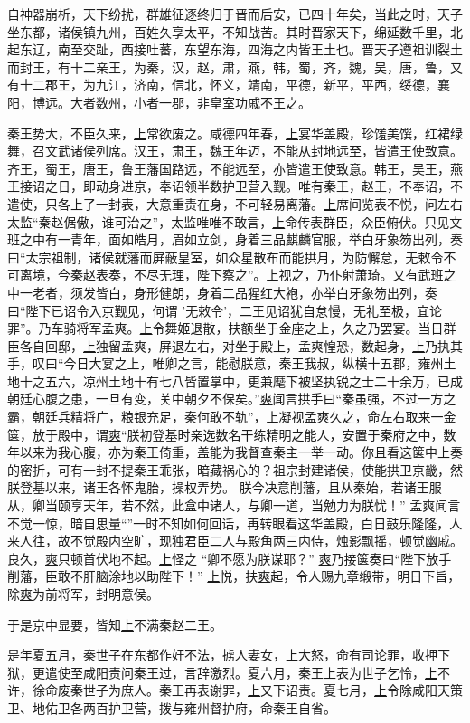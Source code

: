 \documentclass[UTF8]{ctexart}
\begin{document}
自神器崩析，天下纷扰，群雄征逐终归于晋而后安，已四十年矣，当此之时，天子坐东都，诸侯镇九州，百姓久享太平，不知战苦。其时晋家天下，绵延数千里，北起东辽，南至交趾，西接吐蕃，东望东海，四海之内皆王土也。晋天子遵祖训裂土而封王，有十二亲王，为秦，汉，赵，肃，燕，韩，蜀，齐，魏，吴，唐，鲁，又有十二郡王，为九江，济南，信北，怀义，靖南，平德，新平，平西，绥德，襄阳，博远。大者数州，小者一郡，非皇室功戚不王之。


秦王势大，不臣久来，\uline{上}常欲废之。咸德四年春，\uline{上}宴华盖殿，珍馐美馔，红裙绿舞，召文武诸侯列席。汉王，肃王，魏王年迈，不能从封地远至，皆遣王使致意。齐王，蜀王，唐王，鲁王藩国路远，不能远至，亦皆遣王使致意。韩王，吴王，燕王接诏之日，即动身进京，奉诏领半数护卫营入觐。唯有秦王，赵王，不奉诏，不遣使，只各上了一封表，大意重责在身，不可轻易离藩。\uline{上}席间览表不悦，问左右太监“秦赵倨傲，谁可治之”，太监唯唯不敢言，\uline{上}命传表群臣，众臣俯伏。只见文班之中有一青年，面如皓月，眉如立剑，身着三品麒麟官服，举白牙象笏出列，奏曰“太宗祖制，诸侯就藩而屏蔽皇室，如众星散布而能拱月，为防懈怠，无敕令不可离境，今秦赵表奏，不尽无理，陛下察之”。\uline{上}视之，乃仆射萧琦。又有武班之中一老者，须发皆白，身形健朗，身着二品猩红大袍，亦举白牙象笏出列，奏曰“陛下已诏令入京觐见，何谓 ’无敕令’，二王见诏犹自怠慢，无礼至极，宜论罪”。乃车骑将军孟爽。\uline{上}令舞姬退散，扶额坐于金座之上，久之乃罢宴。当日群臣各自回邸，\uline{上}独留孟爽，屏退左右，对坐于殿上，孟爽惶恐，数起身，\uline{上}乃执其手，叹曰“今日大宴之上，唯卿之言，能慰朕意，秦王我叔，纵横十五郡，雍州土地十之五六，凉州土地十有七八皆置掌中，更兼麾下被坚执锐之士二十余万，已成朝廷心腹之患，一旦有变，关中朝夕不保矣。”\uline{爽}闻言拱手曰“秦虽强，不过一方之霸，朝廷兵精将广，粮银充足，秦何敢不轨”，\uline{上}凝视孟爽久之，命左右取来一金箧，放于殿中，谓\uline{爽}“朕初登基时亲选数名干练精明之能人，安置于秦府之中，数年以来为我心腹，亦为秦王倚重，盖能为我督查秦主一举一动。你且看这箧中上奏的密折，可有一封不提秦王乖张，暗藏祸心的？祖宗封建诸侯，使能拱卫京畿，然朕登基以来，诸王各怀鬼胎，操权弄势。 朕今决意削藩，且从秦始，若诸王服从，卿当颐享天年，若不然，此盒中诸人，与卿一道，当勉力为朕忧！” 孟爽闻言不觉一惊，暗自思量“”一时不知如何回话，再转眼看这华盖殿，白日鼓乐隆隆，人来人往，故不觉殿内空旷，现独君臣二人与殿角两三内侍，烛影飘摇，顿觉幽戚。良久，\uline{爽}只顿首伏地不起。\uline{上}怪之 “卿不愿为朕谋耶？” \uline{爽}乃接箧奏曰“陛下放手削藩，臣敢不肝脑涂地以助陛下！” \uline{上}悦，扶\uline{爽}起，令人赐九章缎带，明日下旨，除\uline{爽}为前将军，封明意侯。


于是京中显要，皆知\uline{上}不满秦赵二王。


是年夏五月，秦世子在东都作奸不法，掳人妻女，\uline{上}大怒，命有司论罪，收押下狱，更遣使至咸阳责问秦王过，言辞激烈。夏六月，秦王上表为世子乞怜，\uline{上}不许，徐命废秦世子为庶人。秦王再表谢罪，\uline{上}又下诏责。夏七月，\uline{上}令除咸阳天策卫、地佑卫各两百护卫营，拨与雍州督护府，命秦王自省。
\end{document}
